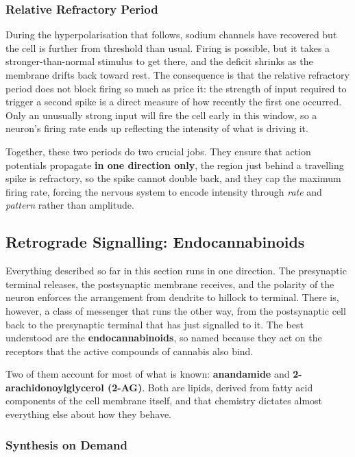 \documentclass[11pt]{article}
\begin{document}
\subsubsection{Relative Refractory Period}

During the hyperpolarisation that follows, sodium channels have recovered but the cell is further from threshold than usual. Firing is possible, but it takes a stronger-than-normal stimulus to get there, and the deficit shrinks as the membrane drifts back toward rest. The consequence is that the relative refractory period does not block firing so much as price it: the strength of input required to trigger a second spike is a direct measure of how recently the first one occurred. Only an unusually strong input will fire the cell early in this window, so a neuron's firing rate ends up reflecting the intensity of what is driving it.

Together, these two periods do two crucial jobs. They ensure that action potentials propagate \textbf{in one direction only}, the region just behind a travelling spike is refractory, so the spike cannot double back, and they cap the maximum firing rate, forcing the nervous system to encode intensity through \textit{rate} and \textit{pattern} rather than amplitude.

\subsection{Retrograde Signalling: Endocannabinoids}

Everything described so far in this section runs in one direction. The presynaptic terminal releases, the postsynaptic membrane receives, and the polarity of the neuron enforces the arrangement from dendrite to hillock to terminal. There is, however, a class of messenger that runs the other way, from the postsynaptic cell back to the presynaptic terminal that has just signalled to it. The best understood are the \textbf{endocannabinoids}, so named because they act on the receptors that the active compounds of cannabis also bind.

Two of them account for most of what is known: \textbf{anandamide} and \textbf{2-arachidonoylglycerol (2-AG)}. Both are lipids, derived from fatty acid components of the cell membrane itself, and that chemistry dictates almost everything else about how they behave.

\subsubsection{Synthesis on Demand}
\end{document}

